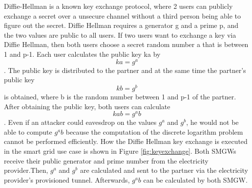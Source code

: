 Diffie-Hellman is a known key exchange protocol, where 2 users can publicly exchange a secret over a unsecure channel without a third person being able to figure out the secret. 
Diffie Hellman requires a generator g and a prime p, and the two values are public to all users. If two users want to exchange a key via Diffie Hellman, then both users choose a secret random number a that is between 1 and p-1. Each user calculates the public key ka by \[ ka=g^a \]. The public key is distributed to the partner and at the same time the partner's public key \[ kb=g^b \] is obtained, where b is the random number between 1 and p-1 of the partner. After obtaining the public key, both users can calculate\[ kab=g^ab \]. Even if an attacker could eavesdrop on the values $g^a$ and $g^b$, he would not be able to compute $g^ab$ because the computation of the discrete logarithm problem cannot be performed efficiently. How the Diffie Hellman key exchange is executed in the smart grid use case is shown in Figure \ref{fig:keyexchange}. 
Both SMGWs receive their public generator and prime number from the electricity provider.Then, $g^a$ and $g^b$ are calculated and sent to the partner via the electricity provider's provisioned tunnel. Afterwards, $g^ab$ can be calculated by both SMGW.


